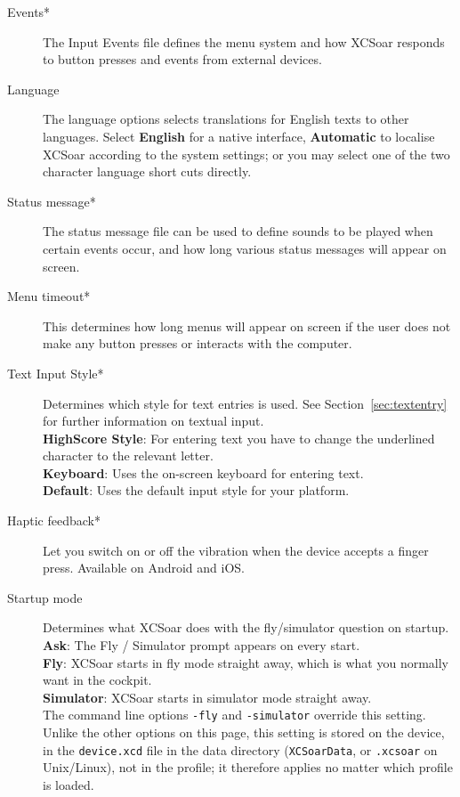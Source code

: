 \begin{description}
\item[Events*]  The Input Events file defines the menu system and how XCSoar
  responds to button presses and events from external devices.
\item[Language]  The language options selects translations for English texts to
  other languages.  Select {\bf English} for a native interface, {\bf Automatic}
  to localise XCSoar according to the system settings; or you may select one of 
  the two character language short cuts directly.
\item[Status message*]  The status message file can be used to define sounds to 
  be played when certain events occur, and how long various status messages will 
  appear on screen.
\item[Menu timeout*]  This determines how long menus will appear on screen if the user
  does not make any button presses or interacts with the computer.
\item[Text Input Style*]  Determines which style for text entries is used. 
  See Section~\ref{sec:textentry} for further information on textual input. \\
  {\bf HighScore Style}: For entering text you have to change the underlined 
  character to the relevant letter. \\
  {\bf Keyboard}: Uses the on-screen keyboard for entering text. \\
  {\bf Default}: Uses the default input style for your platform.
\item[Haptic feedback*]  Let you switch on or off the vibration
  when the device accepts a finger press.  Available on Android
  and iOS.
\item[Startup mode]  Determines what XCSoar does with the fly/simulator
  question on startup. \\
  {\bf Ask}: The Fly / Simulator prompt appears on every start. \\
  {\bf Fly}: XCSoar starts in fly mode straight away, which is what you
  normally want in the cockpit. \\
  {\bf Simulator}: XCSoar starts in simulator mode straight away. \\
  The command line options \verb|-fly| and \verb|-simulator| override this
  setting.  Unlike the other options on this page, this setting is stored
  on the device, in the \texttt{device.xcd} file in the data directory
  (\texttt{XCSoarData}, or \texttt{.xcsoar} on Unix/Linux), not in the
  profile; it therefore applies no matter which profile is loaded.
\end{description}

